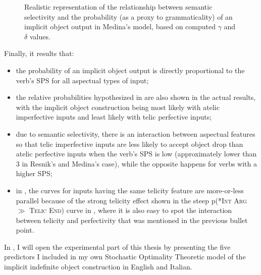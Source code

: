 \begin{figure}[htb]
\caption{Realistic representation of the relationship between semantic selectivity and the probability (as a proxy to grammaticality) of an implicit object output in Medina's model, based on computed $\gamma$ and $\delta$ values.}
\end{figure}

Finally, it results that:
\begin{itemize}
    \item the probability of an implicit object output is directly proportional to the verb's SPS for all aspectual types of input;
    \item the relative probabilities hypothesized in  are also shown in the actual results, with the implicit object construction being most likely with atelic imperfective inputs and least likely with telic perfective inputs;
    \item due to semantic selectivity, there is an interaction between aspectual features so that telic imperfective inputs are less likely to accept object drop than atelic perfective inputs when the verb's SPS is low (approximately lower than 3 in Resnik's and Medina's case), while the opposite happens for verbs with a higher SPS;
    \item in , the curves for inputs having the same telicity feature are more-or-less parallel because of the strong telicity effect shown in the steep p(\textsc{*Int Arg} $\gg$ \textsc{Telic End}) curve in , where it is also easy to spot the interaction between telicity and perfectivity that was mentioned in the previous bullet point.
\end{itemize}

In , I will open the experimental part of this thesis by presenting the five predictors I included in my own Stochastic Optimality Theoretic model of the implicit indefinite object construction in English and Italian.
